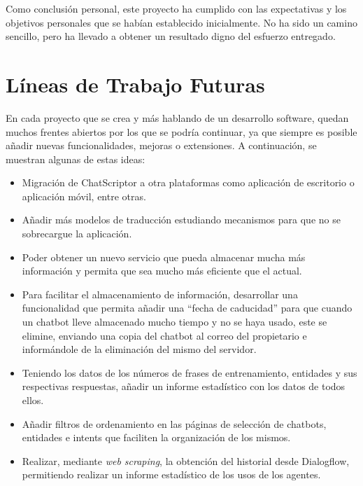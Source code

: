 Como conclusión personal, este proyecto ha cumplido con las expectativas y los objetivos personales que se habían establecido inicialmente. No ha sido un camino sencillo, pero ha llevado a obtener un resultado digno del esfuerzo entregado.

\section{Líneas de Trabajo Futuras}
En cada proyecto que se crea y más hablando de un desarrollo software, quedan muchos frentes abiertos por los que se podría continuar, ya que siempre es posible añadir nuevas funcionalidades, mejoras o extensiones. A continuación, se muestran algunas de estas ideas:
\begin{itemize}
    \item Migración de ChatScriptor a otra plataformas como aplicación de escritorio o aplicación móvil, entre otras.
    \item Añadir más modelos de traducción estudiando mecanismos para que no se sobrecargue la aplicación.
    \item Poder obtener un nuevo servicio que pueda almacenar mucha más información y permita que sea mucho más eficiente que el actual.
    \item Para facilitar el almacenamiento de información, desarrollar una funcionalidad que permita añadir una ``fecha de caducidad'' para que cuando un chatbot lleve almacenado mucho tiempo y no se haya usado, este se elimine, enviando una copia del chatbot al correo del propietario e informándole de la eliminación del mismo del servidor.
    \item Teniendo los datos de los números de frases de entrenamiento, entidades y sus respectivas respuestas, añadir un informe estadístico con los datos de todos ellos.
    \item Añadir filtros de ordenamiento en las páginas de selección de chatbots, entidades e intents que faciliten la organización de los mismos.
    \item Realizar, mediante \textit{web scraping}, la obtención del historial desde Dialogflow, permitiendo realizar un informe estadístico de los usos de los agentes.
\end{itemize}